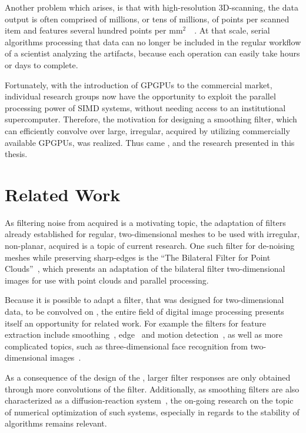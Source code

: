 Another problem which arises, is that with high-resolution 3D-scanning, the data output is often comprised of millions, or tens of millions, of points per scanned item and features several hundred points per mm$^2$~\cite[25,144]{Mara17}~\cite[4]{ILATO14}. At that scale, serial algorithms processing that data can no longer be included in the regular workflow of a scientist analyzing the artifacts, because each operation can easily take hours or days to complete.


Fortunately, with the introduction of \glspl{GPGPU} to the commercial market, individual research groups now have the opportunity to exploit the parallel processing power of \gls{SIMD} systems, without needing access to an institutional supercomputer. Therefore, the motivation for designing a smoothing filter, which can efficiently convolve over large, irregular, acquired \tdd{} by utilizing commercially available \glspl{GPGPU}, was realized. Thus came , and the research presented in this thesis.

%
%
%
%
%
%
\section{Related Work}
As filtering noise from acquired \tdd{} is a motivating topic, the adaptation of filters already established for regular, two-dimensional meshes to be used with irregular, non-planar, acquired \tdd{} is a topic of current research. One such filter for de-noising meshes while preserving sharp-edges is the ``The Bilateral Filter for Point Clouds''~\cite{Digne17}, which presents an adaptation of the bilateral filter two-dimensional images for use with point clouds and parallel processing.

Because it is possible to adapt a filter, that was designed for two-dimensional data, to be convolved on \tdd{}, the entire field of digital image processing presents itself an opportunity for related work. For example the filters for feature extraction include smoothing~\cite[p.~299]{Jaehne97}, edge~\cite[p.~331]{Jaehne97} and motion detection~\cite[p.~397]{Jaehne97}, as well as more complicated topics, such as three-dimensional face recognition from two-dimensional images~\cite{faceRecog19}.

As a consequence of the design of the , larger filter responses are only obtained through more convolutions of the filter. Additionally, as smoothing filters are also characterized as a diffusion-reaction system~\cite[p.~474]{Jaehne97}, the on-going research on the topic of numerical optimization of such systems, especially in regards to the stability of algorithms remains relevant.

